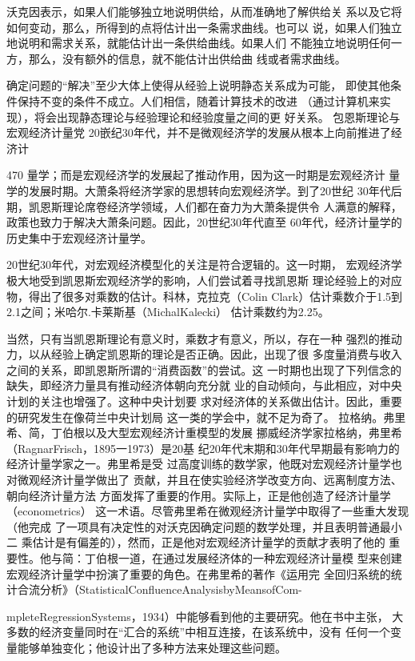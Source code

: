 沃克因表示，如果人们能够独立地说明供给，从而准确地了解供给关
系以及它将如何变动，那么，所得到的点将估计出一条需求曲线。也可以
说，如果人们独立地说明和需求关系，就能估计出一条供给曲线。如果人们
不能独立地说明任何一方，那么，没有额外的信息，就不能估计出供给曲
线或者需求曲线。

确定问题的“解决”至少大体上使得从经验上说明静态关系成为可能，
即使其他条件保持不变的条件不成立。人们相信，随着计算技术的改进
（通过计算机来实现），将会出现静态理论与经验理论和经验度量之间的更
好关系。
包恩斯理论与宏观经济计量党
20嵌纪30年代，并不是微观经济学的发展从根本上向前推进了经济计


470
量学；而是宏观经济学的发展起了推动作用，因为这一时期是宏观经济计
量学的发展时期。大萧条将经济学家的思想转向宏观经济学。到了20世纪
30年代后期，凯恩斯理论席卷经济学领域，人们都在奋力为大萧条提供令
人满意的解释，政策也致力于解决大萧条问题。因此，20世纪30年代直至
60年代，经济计量学的历史集中于宏观经济计量学。

20世纪30年代，对宏观经济模型化的关注是符合逻辑的。这一时期，
宏观经济学极大地受到凯恩斯宏观经济学的影响，人们尝试着寻找凯恩斯
理论经验上的对应物，得出了很多对乘数的估计。科林，克拉克（Colin
Clark）估计乘数介于1.5到2.1之间；米哈尔.卡莱斯基（MichalKalecki）
估计乘数约为2.25。

当然，只有当凯恩斯理论有意义时，乘数才有意义，所以，存在一种
强烈的推动力，以从经验上确定凯恩斯的理论是否正确。因此，出现了很
多度量消费与收入之间的关系，即凯恩斯所谓的“消费函数”的尝试。这
一时期也出现了下列信念的缺失，即经济力量具有推动经济体朝向充分就
业的自动倾向，与此相应，对中央计划的关注也增强了。这种中央计划要
求对经济体的关系做出估计。因此，重要的研究发生在像荷兰中央计划局
这一类的学会中，就不足为奇了。
拉格纳。弗里希、简，丁伯根以及大型宏观经济计重模型的发展
挪威经济学家拉格纳，弗里希（RagnarFrisch，1895一1973）是20基
纪20年代末期和30年代早期最有影响力的经济计量学家之一。弗里希是受
过高度训练的数学家，他既对宏观经济计量学也对微观经济计量学做出了
贡献，并且在使实验经济学改变方向、远离制度方法、朝向经济计量方法
方面发挥了重要的作用。实际上，正是他创造了经济计量学（econometrics）
这一术语。尽管弗里希在微观经济计量学中取得了一些重大发现（他完成
了一项具有决定性的对沃克因确定问题的数学处理，并且表明普通最小二
乘估计是有偏差的），然而，正是他对宏观经济计量学的贡献才表明了他的
重要性。他与简：丁伯根一道，在通过发展经济体的一种宏观经济计量模
型来创建宏观经济计量学中扮演了重要的角色。在弗里希的著作《运用完
全回归系统的统计合流分析》（StatisticalConfluenceAnalysisbyMeansofCom-


mpleteRegressionSystems，1934）中能够看到他的主要研究。他在书中主张，
大多数的经济变量同时在“汇合的系统”中相互连接，在该系统中，没有
任何一个变量能够单独变化；他设计出了多种方法来处理这些问题。

